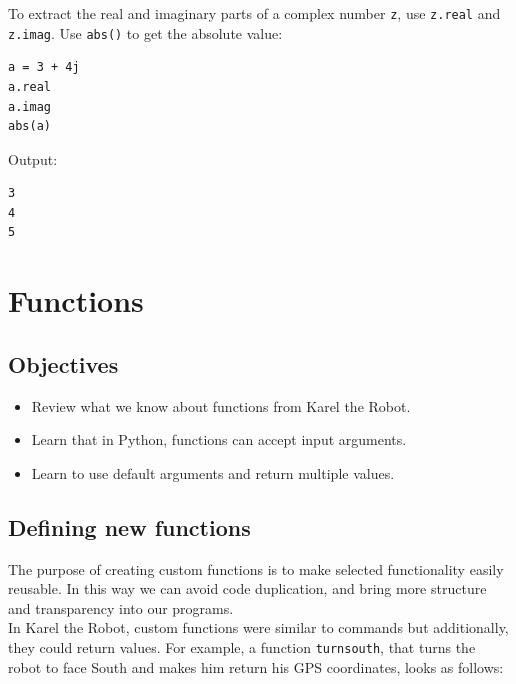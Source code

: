 \documentclass[article,A4,12pt]{llncs}
\begin{document}
\noindent
To extract the real and imaginary parts of a complex number {\tt z}, use {\tt z.real}
and {\tt z.imag}. Use {\tt abs()} to get the absolute value:\\

\begin{bbox}
\begin{verbatim}
a = 3 + 4j
a.real
a.imag
abs(a)
\end{verbatim}
\end{bbox}
\vspace{6mm}

\noindent
Output:\\

\begin{ybox}
\begin{verbatim}
3
4
5
\end{verbatim}
\end{ybox}
\vspace{6mm}

\noindent


\section{Functions}

\subsection{Objectives}

\begin{itemize}
\item Review what we know about functions from Karel the Robot.
\item Learn that in Python, functions can accept input arguments.
\item Learn to use default arguments and return multiple values.
\end{itemize}

\subsection{Defining new functions}

The purpose of creating custom functions is to make selected functionality 
easily reusable. In this way we can avoid code duplication, and bring more 
structure and transparency into our programs. \\

\noindent
In Karel the Robot, custom functions were similar to commands but 
additionally, they could return values. For example, a function 
{\tt turnsouth}, that turns the robot to face South and makes him 
return his GPS coordinates, looks as follows:\\
\end{document}
